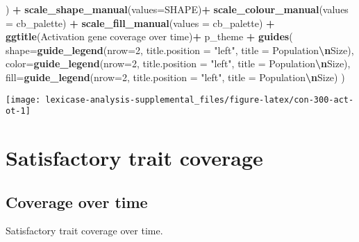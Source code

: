 \documentclass[
]{book}
\newenvironment{Shaded}{\begin{snugshade}}{\end{snugshade}}
\newcommand{\AttributeTok}[1]{\textcolor[rgb]{0.13,0.29,0.53}{#1}}
\newcommand{\DecValTok}[1]{\textcolor[rgb]{0.00,0.00,0.81}{#1}}
\newcommand{\FunctionTok}[1]{\textcolor[rgb]{0.13,0.29,0.53}{\textbf{#1}}}
\newcommand{\NormalTok}[1]{#1}
\newcommand{\SpecialCharTok}[1]{\textcolor[rgb]{0.81,0.36,0.00}{\textbf{#1}}}
\newcommand{\StringTok}[1]{\textcolor[rgb]{0.31,0.60,0.02}{#1}}
\begin{document}
\begin{Shaded}
\begin{Highlighting}[]
\NormalTok{  ) }\SpecialCharTok{+}
  \FunctionTok{scale\_shape\_manual}\NormalTok{(}\AttributeTok{values=}\NormalTok{SHAPE)}\SpecialCharTok{+}
  \FunctionTok{scale\_colour\_manual}\NormalTok{(}\AttributeTok{values =}\NormalTok{ cb\_palette) }\SpecialCharTok{+}
  \FunctionTok{scale\_fill\_manual}\NormalTok{(}\AttributeTok{values =}\NormalTok{ cb\_palette) }\SpecialCharTok{+}
  \FunctionTok{ggtitle}\NormalTok{(}\StringTok{\textquotesingle{}Activation gene coverage over time\textquotesingle{}}\NormalTok{)}\SpecialCharTok{+}
\NormalTok{  p\_theme }\SpecialCharTok{+}
  \FunctionTok{guides}\NormalTok{(}
    \AttributeTok{shape=}\FunctionTok{guide\_legend}\NormalTok{(}\AttributeTok{nrow=}\DecValTok{2}\NormalTok{, }\AttributeTok{title.position =} \StringTok{"left"}\NormalTok{, }\AttributeTok{title =} \StringTok{\textquotesingle{}Population}\SpecialCharTok{\textbackslash{}n}\StringTok{Size\textquotesingle{}}\NormalTok{),}
    \AttributeTok{color=}\FunctionTok{guide\_legend}\NormalTok{(}\AttributeTok{nrow=}\DecValTok{2}\NormalTok{, }\AttributeTok{title.position =} \StringTok{"left"}\NormalTok{, }\AttributeTok{title =} \StringTok{\textquotesingle{}Population}\SpecialCharTok{\textbackslash{}n}\StringTok{Size\textquotesingle{}}\NormalTok{),}
    \AttributeTok{fill=}\FunctionTok{guide\_legend}\NormalTok{(}\AttributeTok{nrow=}\DecValTok{2}\NormalTok{, }\AttributeTok{title.position =} \StringTok{"left"}\NormalTok{, }\AttributeTok{title =} \StringTok{\textquotesingle{}Population}\SpecialCharTok{\textbackslash{}n}\StringTok{Size\textquotesingle{}}\NormalTok{)}
\NormalTok{  )}
\end{Highlighting}
\end{Shaded}

\texttt{[image: lexicase-analysis-supplemental\_files/figure-latex/con-300-act-ot-1]}

\hypertarget{satisfactory-trait-coverage-2}{%
\section{Satisfactory trait coverage}\label{satisfactory-trait-coverage-2}}

\hypertarget{coverage-over-time-5}{%
\subsection{Coverage over time}\label{coverage-over-time-5}}

Satisfactory trait coverage over time.
\end{document}
